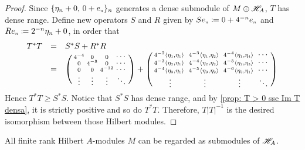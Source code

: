 \begin{teorema}
\begin{proof}
Since $\{\eta_n + 0,\,0 + \sub e n  \}_n$ generates a dense submodule of $M\oplus \mathscr H_A$, $T$ has dense range. Define new operators $S$ and $R$ given by $S\sub e n \coloneqq 0 + 4^{-n}\sub e n$ and $R\sub e n \coloneqq 2^{-n}\eta_n + 0$, in order that
\begin{equation*}
    \begin{array}{rcl}
         T^*T &=& S^*S + R^*R \\ 
         &=& \left(\begin{smallmatrix} 
         4^{-4} & 0 & 0 & \scaleobj{1}{\cdots}\\
         0 & 4^{-8} & 0 & \scaleobj{1}{\cdots}\\
         0 & 0 & 4^{-12} & \scaleobj{1}{\cdots}\\
         \vdots & \vdots & \vdots & \ddots
         \end{smallmatrix}\right) + \left(\begin{smallmatrix} 
         4^{-2}\inner{\sub\eta 1}{\sub\eta 1}\hphantom{i} & 4^{-3}\inner{\sub\eta 1}{\sub\eta 2}\hphantom{i} & 4^{-4}\inner{\sub\eta 1}{\sub\eta 4}\hphantom{i}& \scaleobj{1}{\cdots}\\
         4^{-3}\inner{\sub\eta 2}{\sub\eta 1}\hphantom{i} & 4^{-4}\inner{\sub\eta 2}{\sub\eta 2}\hphantom{i} & 4^{-5}\inner{\sub\eta 2}{\sub\eta 3}\hphantom{i} & \scaleobj{1}{\cdots}\\
         4^{-4}\inner{\sub\eta 3}{\sub\eta 1}\hphantom{i} & 4^{-5}\inner{\sub\eta 3}{\sub\eta 2}\hphantom{i} & 4^{-6}\inner{\sub\eta 3}{\sub\eta 1}\hphantom{i} & \scaleobj{1}{\cdots}\\
         \vdots & \vdots & \vdots & \ddots
         \end{smallmatrix}\right)
    \end{array}
\end{equation*}
Hence $T^*T \geqslant S^*S$. Notice that $S^*S$ has dense range, and by \ref{prop: T > 0 sse Im T densa}, it is strictly positive and so do $T^*T$. Therefore, $T |T|^{-1}$ is the desired  isomorphism between those Hilbert modules.
\end{proof}
\end{teorema}

\begin{corolario}
    All finite rank Hilbert $A$-modules $M$ can be regarded as submodules of $\mathscr H_A$.
\end{corolario}

